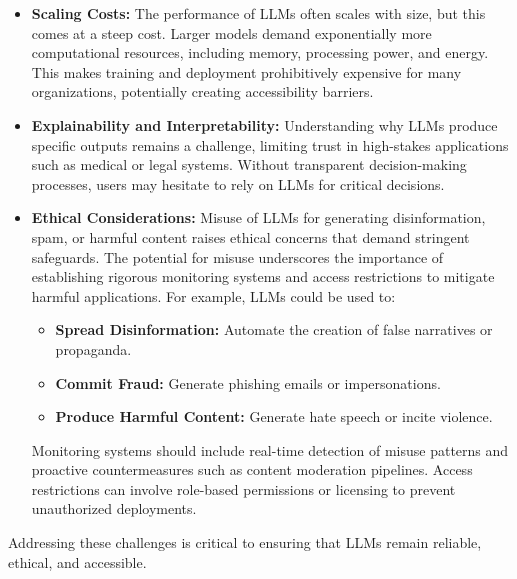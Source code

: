 \begin{flushleft}
\begin{itemize}
        \item \textbf{Scaling Costs:} The performance of LLMs often scales with size, but this comes at a steep cost. Larger models demand exponentially more computational resources, including memory, processing power, and energy. This makes training and deployment prohibitively expensive for many organizations, potentially creating accessibility barriers.

        \item \textbf{Explainability and Interpretability:} Understanding why LLMs produce specific outputs remains a challenge, limiting trust in high-stakes applications such as medical or legal systems. Without transparent decision-making processes, users may hesitate to rely on LLMs for critical decisions.

        \item \textbf{Ethical Considerations:} Misuse of LLMs for generating disinformation, spam, or harmful content raises ethical concerns that demand stringent safeguards. The potential for misuse underscores the importance of establishing rigorous monitoring systems and access restrictions to mitigate harmful applications. For example, LLMs could be used to:
        \begin{itemize}
            \item \textbf{Spread Disinformation:} Automate the creation of false narratives or propaganda.
            \item \textbf{Commit Fraud:} Generate phishing emails or impersonations.
            \item \textbf{Produce Harmful Content:} Generate hate speech or incite violence.
        \end{itemize}
        Monitoring systems should include real-time detection of misuse patterns and proactive countermeasures such as content moderation pipelines. Access restrictions can involve role-based permissions or licensing to prevent unauthorized deployments.
    \end{itemize}

    Addressing these challenges is critical to ensuring that LLMs remain reliable, ethical, and accessible. \break


\end{flushleft}
